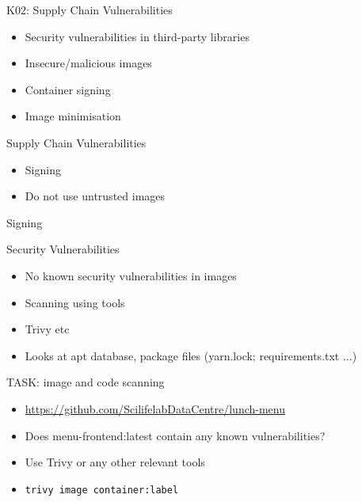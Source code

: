 \documentclass{dcpresentation}
\begin{document}
\begin{frame}{K02: Supply Chain Vulnerabilities}
  \begin{itemize}
  \item Security vulnerabilities in third-party libraries
  \item Insecure/malicious images
  \item Container signing
  \item Image minimisation
  \end{itemize}
\end{frame}

\begin{frame}{Supply Chain Vulnerabilities}
  \begin{itemize}
  \item Signing
  \item Do not use untrusted images
  \end{itemize}
  Signing

\end{frame}

\begin{frame}{Security Vulnerabilities}
  \begin{itemize}
  \item No known security vulnerabilities in images
  \item Scanning using tools
  \item Trivy etc
  \item Looks at apt database, package files (yarn.lock; requirements.txt ...)
  \end{itemize}  
\end{frame}


% 

\begin{frame}{TASK: image and code scanning}
  \begin{itemize}
  \item \url{https://github.com/ScilifelabDataCentre/lunch-menu}
  \item Does menu-frontend:latest contain any known vulnerabilities?
  \item Use Trivy or any other relevant tools
  \item \texttt{trivy image container:label}
  \end{itemize}
\end{frame}
\end{document}

